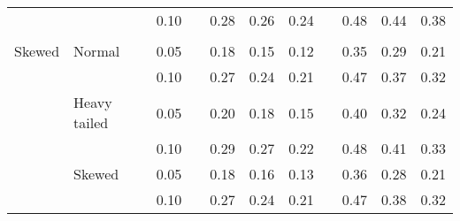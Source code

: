 \begin{table}[ht]
\begin{scriptsize}
\begin{center}
\begin{tabular}{ll p{.1cm} c p{.1cm} rrr p{.1cm} rrr}
             &              && 0.10 &&  0.28 & 0.26 & 0.24 && 0.48 & 0.44 & 0.38 \\ 
             &&&&&&&&&&&\\
Skewed       & Normal       && 0.05 &&  0.18 & 0.15 & 0.12 && 0.35 & 0.29 & 0.21 \\ 
             &              && 0.10 &&  0.27 & 0.24 & 0.21 && 0.47 & 0.37 & 0.32 \\ 
             & Heavy tailed && 0.05 &&  0.20 & 0.18 & 0.15 && 0.40 & 0.32 & 0.24 \\ 
             &              && 0.10 &&  0.29 & 0.27 & 0.22 && 0.48 & 0.41 & 0.33 \\ 
             & Skewed       && 0.05 &&  0.18 & 0.16 & 0.13 && 0.36 & 0.28 & 0.21 \\ 
             &              && 0.10 &&  0.27 & 0.24 & 0.21 && 0.47 & 0.38 & 0.32 \\ 

\hline
\end{tabular}
\end{center}
\end{scriptsize}
\end{table}


